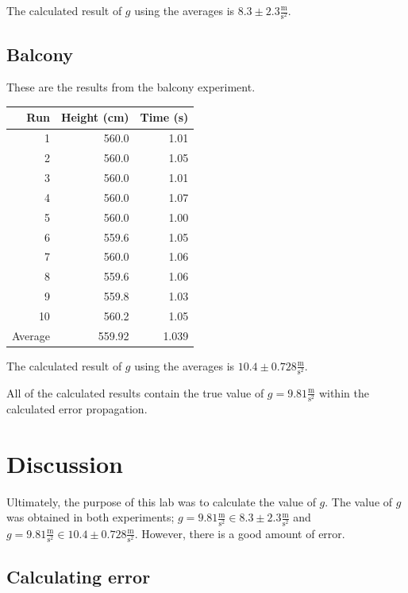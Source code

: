 \documentclass[12pt]{article}
\begin{document}
The calculated result of \(g\) using the averages is \(8.3\pm2.3 \frac{\text{m}}{\text{s}^{2}}\).
\subsection{Balcony}
\label{sec:org3983beb}

These are the results from the balcony experiment.

\begin{center}
\begin{tabular}{r|r|r}
Run & Height (cm) & Time (s)\\
\hline
1 & 560.0 & 1.01\\
2 & 560.0 & 1.05\\
3 & 560.0 & 1.01\\
4 & 560.0 & 1.07\\
5 & 560.0 & 1.00\\
6 & 559.6 & 1.05\\
7 & 560.0 & 1.06\\
8 & 559.6 & 1.06\\
9 & 559.8 & 1.03\\
10 & 560.2 & 1.05\\
\hline
Average & 559.92 & 1.039\\
\end{tabular}
\end{center}

The calculated result of \(g\) using the averages is \(10.4\pm 0.728 \frac{\text{m}}{\text{s}^{2}}\).

All of the calculated results contain the true value of \(g = 9.81 \frac{\text{m}}{\text{s}^{2}}\) within the calculated error propagation.
\section{Discussion}
\label{sec:orgf9a894b}

Ultimately, the purpose of this lab was to calculate the value of \(g\). The value of \(g\) was obtained in both experiments; \(g = 9.81 \frac{\text{m}}{\text{s}^{2}} \in 8.3\pm2.3 \frac{\text{m}}{\text{s}^{2}}\) and \(g = 9.81 \frac{\text{m}}{\text{s}^{2}} \in 10.4\pm 0.728 \frac{\text{m}}{\text{s}^{2}}\). However, there is a good amount of error.
\subsection{Calculating error}
\label{sec:orgd7a077e}
\end{document}
